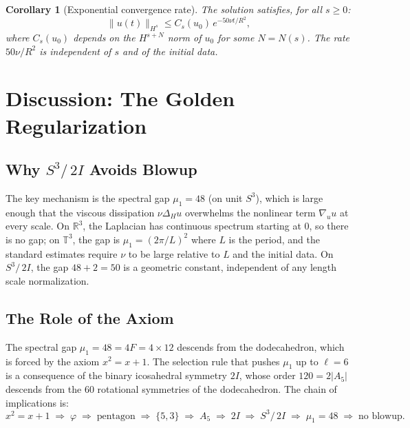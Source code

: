 \documentclass[11pt,a4paper]{article}
\theoremstyle{plain}
\newtheorem{corollary}[theorem]{Corollary}
\theoremstyle{definition}
\newcommand{\R}{\mathbb{R}}
\newcommand{\phig}{\varphi}              %
\newcommand{\Lap}{\Delta}                 %
\newcommand{\DS}{S^3\!/\,2I}             %
\newcommand{\BI}{2I}                      %
\newcommand{\norm}[1]{\lVert #1 \rVert}
\newcommand{\abs}[1]{\lvert #1 \rvert}
\begin{document}
\begin{corollary}[Exponential convergence rate]\label{cor:rate}
The solution satisfies, for all $s \ge 0$:
\begin{equation}\label{eq:Hsdecay}
  \norm{u(t)}_{H^s}
  \le C_s(u_0)\, e^{-50\nu t / R^2},
\end{equation}
where $C_s(u_0)$ depends on the $H^{s+N}$ norm of $u_0$ for some $N = N(s)$.
The rate $50\nu/R^2$ is \emph{independent} of $s$ and of the initial data.
\end{corollary}

\section{Discussion: The Golden Regularization}\label{sec:discussion}

\subsection{Why $\DS$ Avoids Blowup}

The key mechanism is the spectral gap $\mu_1 = 48$ (on unit $S^3$), which is
large enough that the viscous dissipation $\nu \Lap_H u$ overwhelms the
nonlinear term $\nabla_u u$ at every scale.  On $\R^3$, the Laplacian has
continuous spectrum starting at $0$, so there is no gap; on $\mathbb{T}^3$,
the gap is $\mu_1 = (2\pi/L)^2$ where $L$ is the period, and the standard
estimates require $\nu$ to be large relative to $L$ and the initial data.
On $\DS$, the gap $48 + 2 = 50$ is a geometric constant, independent of any
length scale normalization.

\subsection{The Role of the Axiom}

The spectral gap $\mu_1 = 48 = 4F = 4 \times 12$ descends from the
dodecahedron, which is forced by the axiom $x^2 = x + 1$.  The selection
rule that pushes $\mu_1$ up to $\ell = 6$ is a consequence of the binary
icosahedral symmetry $\BI$, whose order $120 = 2 \abs{A_5}$ descends from
the $60$ rotational symmetries of the dodecahedron.  The chain of
implications is:
\[
  x^2 = x + 1
  \;\Longrightarrow\; \phig
  \;\Longrightarrow\; \text{pentagon}
  \;\Longrightarrow\; \{5,3\}
  \;\Longrightarrow\; A_5
  \;\Longrightarrow\; \BI
  \;\Longrightarrow\; \DS
  \;\Longrightarrow\; \mu_1 = 48
  \;\Longrightarrow\; \text{no blowup}.
\]
\end{document}
